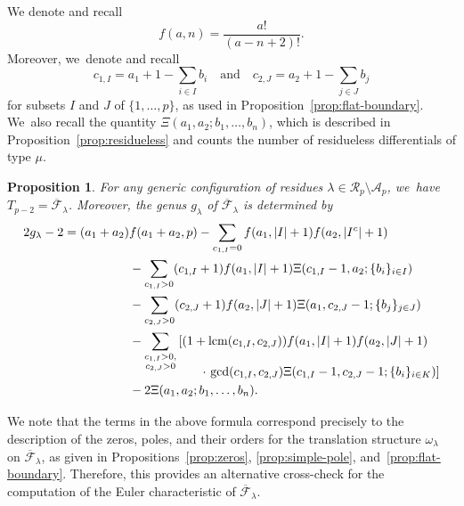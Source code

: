 \documentclass[JEP,XML,SOM,Unicode,NoFloatCountersInSection,published]{cedram}
\DeclareMathOperator{\lcm}{lcm}
\newtheorem{prop}[thm]{Proposition}
\theoremstyle{definition}
\begin{document}
We denote and recall
\[
f(a,n) = \frac{a!}{(a-n+2)!}.
\]
Moreover, we~denote and recall
\[
c_{1,I} = a_1 + 1 - \sum_{i\in I}b_i \quad \text{and} \quad c_{2,J} = a_2 + 1 - \sum_{j\in J}b_j
\]
for subsets $I$ and $J$ of $\{1,\ldots, p\}$, as used in Proposition~\ref{prop:flat-boundary}. We~also recall the quantity $\Xi(a_1,a_2;b_1,\ldots, b_n)$, which is described in Proposition~\ref{prop:residueless} and counts the number of residueless differentials of type $\mu$.

\begin{prop}
\label{prop:T=F}
For any generic configuration of residues $\lambda\in \mathcal{R}_p\setminus \mathcal{A}_p$, we~have $T_{p-2}=\overline{\mathcal F}_\lambda$. Moreover, the genus $g_{\lambda}$ of $\overline{\mathcal F}_\lambda$ is determined by
\begin{align*}
2g_\lambda-2 = (a_1+a_2)&f(a_1+a_2, p) - \sum_{c_{1,I}=0} f(a_1, |I|+1)f(a_2,|I^c|+1)\\
& - \sum_{c_{1,I}>0} (c_{1,I}+1)f(a_1,|I|+1)\Xi(c_{1,I}-1,a_{2};\{b_i\}_{i\in I})\\
& - \sum_{c_{2,J}>0} (c_{2,J}+1)f(a_2,|J|+1)\Xi(a_{1}, c_{2,J}-1;\{b_j\}_{j\in J})\\
& -\sum_{\substack{c_{1,I}>0, \\ c_{2,J}>0}}\left[(1+\lcm(c_{1,I},c_{2,J}))f(a_1,|I|+1)f(a_2,|J|+1)\right.\\[-10pt]
& \hspace*{2cm}\cdot\left.\gcd(c_{1,I},c_{2,J})\Xi(c_{1,I}-1,c_{2,J}-1;\{b_i\}_{i\in K})\right]\\
&-2\Xi(a_1,a_2;b_1,\ldots, b_n).
\end{align*}
\end{prop}

We note that the terms in the above formula correspond precisely to the description of the zeros, poles, and their orders for the translation structure $\omega_\lambda$ on $\overline{\mathcal F}_\lambda$, as given in Propositions~\ref{prop:zeros}, \ref{prop:simple-pole}, and~\ref{prop:flat-boundary}. Therefore, this provides an alternative cross-check for the computation of the Euler characteristic of $\overline{\mathcal F}_\lambda$.
\end{document}
